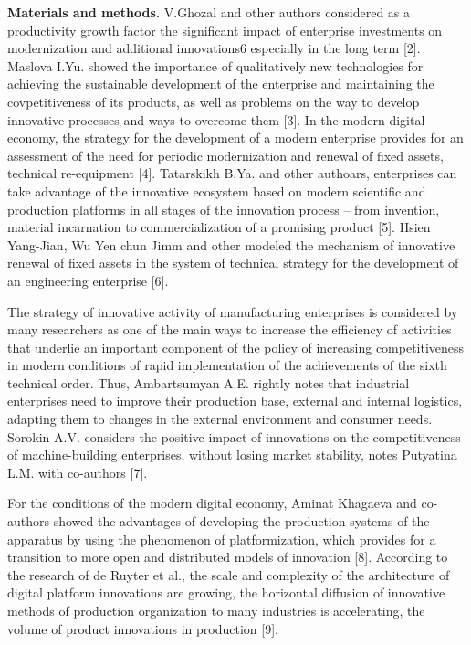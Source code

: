{\bfseries Materials and methods.} V.Ghozal and other authors considered as
a productivity growth factor the significant impact of enterprise
investments on modernization and additional innovations6 especially in
the long term {[}2{]}. Maslova I.Yu. showed the importance of
qualitatively new technologies for achieving the sustainable development
of the enterprise and maintaining the covpetitiveness of its products,
as well as problems on the way to develop innovative processes and ways
to overcome them {[}3{]}. In the modern digital economy, the strategy
for the development of a modern enterprise provides for an assessment of
the need for periodic modernization and renewal of fixed assets,
technical re-equipment {[}4{]}. Tatarskikh B.Ya. and other authoars,
enterprises can take advantage of the innovative ecosystem based on
modern scientific and production platforms in all stages of the
innovation process -- from invention, material incarnation to
commercialization of a promising product {[}5{]}. Hsien Yang-Jian, Wu
Yen chun Jimm and other modeled the mechanism of innovative renewal of
fixed assets in the system of technical strategy for the development of
an engineering enterprise {[}6{]}.

The strategy of innovative activity of manufacturing enterprises is
considered by many researchers as one of the main ways to increase the
efficiency of activities that underlie an important component of the
policy of increasing competitiveness in modern conditions of rapid
implementation of the achievements of the sixth technical order. Thus,
Ambartsumyan A.E. rightly notes that industrial enterprises need to
improve their production base, external and internal logistics, adapting
them to changes in the external environment and consumer needs. Sorokin
A.V. considers the positive impact of innovations on the competitiveness
of machine-building enterprises, without losing market stability, notes
Putyatina L.M. with co-authors {[}7{]}.

For the conditions of the modern digital economy, Aminat Khagaeva and
co-authors showed the advantages of developing the production systems of
the apparatus by using the phenomenon of platformization, which provides
for a transition to more open and distributed models of innovation
{[}8{]}. According to the research of de Ruyter et al., the scale and
complexity of the architecture of digital platform innovations are
growing, the horizontal diffusion of innovative methods of production
organization to many industries is accelerating, the volume of product
innovations in production {[}9{]}.

